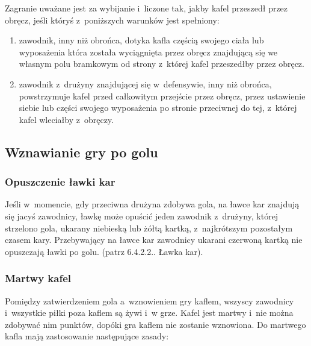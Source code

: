 \documentclass[12pt]{article}
\begin{document}
Zagranie uważane jest za wybijanie i~liczone tak, jakby kafel przeszedł
przez obręcz, jeśli któryś z~poniższych warunków jest spełniony:

\begin{enumerate}
	\item
	      zawodnik, inny niż obrońca, dotyka kafla częścią swojego ciała lub
	      wyposażenia która została wyciągnięta przez obręcz znajdującą się we
	      własnym polu bramkowym od strony z~której kafel przeszedłby przez
	      obręcz.
	\item
	      zawodnik z~drużyny znajdującej się w~defensywie, inny niż obrońca,
	      powstrzymuje kafel przed całkowitym przejście przez obręcz, przez
	      ustawienie siebie lub części swojego wyposażenia po stronie przeciwnej
	      do tej, z~której kafel wleciałby z~obręczy.
\end{enumerate}

\subsection{Wznawianie gry po golu}

\subsubsection{Opuszczenie ławki kar}
Jeśli w~momencie, gdy przeciwna
drużyna zdobywa gola, na ławce kar znajdują się jacyś zawodnicy, ławkę
może opuścić jeden zawodnik z~drużyny, której strzelono gola, ukarany
niebieską lub żółtą kartką, z~najkrótszym pozostałym czasem kary.
Przebywający na ławce kar zawodnicy ukarani czerwoną kartką nie
opuszczają ławki po golu. (patrz 6.4.2.2.. Ławka kar).

\subsubsection{Martwy kafel}
Pomiędzy zatwierdzeniem gola a~wznowieniem
gry kaflem, wszyscy zawodnicy i~wszystkie piłki poza kaflem są żywi i~w
grze. Kafel jest martwy i~nie można zdobywać nim punktów, dopóki gra
kaflem nie zostanie wznowiona. Do martwego kafla mają zastosowanie
następujące zasady:
\end{document}
